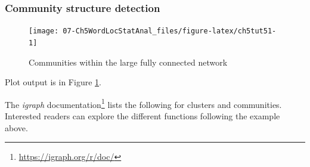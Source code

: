 \documentclass[
]{article}
\newenvironment{Shaded}{\begin{snugshade}}{\end{snugshade}}
\newcommand{\AttributeTok}[1]{\textcolor[rgb]{0.13,0.29,0.53}{#1}}
\newcommand{\ConstantTok}[1]{\textcolor[rgb]{0.56,0.35,0.01}{#1}}
\newcommand{\DecValTok}[1]{\textcolor[rgb]{0.00,0.00,0.81}{#1}}
\newcommand{\FunctionTok}[1]{\textcolor[rgb]{0.13,0.29,0.53}{\textbf{#1}}}
\newcommand{\NormalTok}[1]{#1}
\newcommand{\OtherTok}[1]{\textcolor[rgb]{0.56,0.35,0.01}{#1}}
\newcommand{\SpecialCharTok}[1]{\textcolor[rgb]{0.81,0.36,0.00}{\textbf{#1}}}
\begin{document}
\normalsize

\hypertarget{community-structure-detection}{%
\subsubsection{Community structure detection}\label{community-structure-detection}}

\begin{Shaded}
\end{Shaded}

\begin{figure}

{\centering \texttt{[image: 07-Ch5WordLocStatAnal\_files/figure-latex/ch5tut51-1]} 

}

\caption{Communities within the large fully connected network}\label{fig:ch5tut51}
\end{figure}

Plot output is in Figure \ref{fig:ch5tut51}.

The \emph{igraph} documentation\footnote{\url{https://igraph.org/r/doc/}} lists the following for clusters and communities. Interested readers can explore the different functions following the example above.
\end{document}
